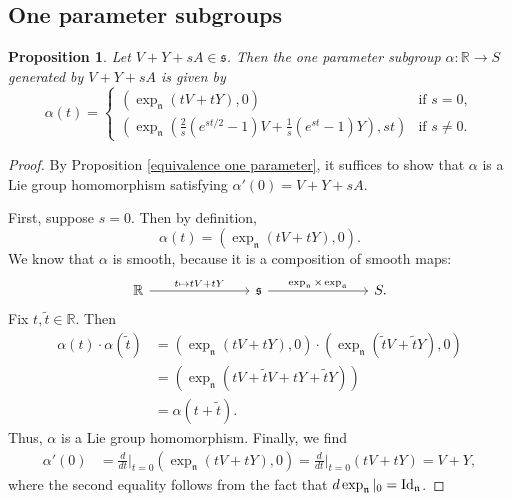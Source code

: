 \documentclass{amsart}
\newcommand{\R}{\mathbb R}
\newcommand{\id}{\text{\normalfont Id}}
\newcommand{\s}{\mathfrak s}
\newcommand{\n}{\mathfrak n}
\renewcommand{\a}{\mathfrak a}
\theoremstyle{plain}
\newtheorem{proposition}[theorem]{Proposition}
\theoremstyle{definition}
\theoremstyle{remark}
\begin{document}
 	\subsection{One parameter subgroups}
 	\begin{proposition}
 		\label{one parameter subgroup}
 		Let $V+Y+sA \in \s$. Then the one parameter subgroup $\alpha: \R \rightarrow S$ generated by $V + Y + sA$ is given by 
 		$$\alpha(t) = \begin{cases}
 			(\exp_{\n}(tV + tY),0) & \text{if }s = 0, \\
 			\left(\exp_{\n}\left(\frac 2s(e^{st/2}-1)V + \frac1s(e^{st}-1) Y\right),st\right) & \text{if }s \neq  0.
 		\end{cases}$$
 	\end{proposition}
 	\begin{proof}
 		By Proposition \ref{equivalence one parameter}, it suffices to show that $\alpha$ is a Lie group homomorphism satisfying $\alpha'(0) = V + Y + sA$.
 		
 		First, suppose $s = 0$. Then by definition,
 		$$\alpha(t) = (\exp_{\n}(tV + tY),0).$$
 		We know that $\alpha$ is smooth, because it is a composition of smooth maps:
 		$$\begin{tikzcd}
 			\R \arrow{rrr}{t \mapsto t V + tY} &&& \s  \arrow{rrr}{\exp_\n \times \exp_\a}&&& S.
 		\end{tikzcd}$$
 		Fix $t, \widetilde t \in \R$. Then 
 		\begin{align*}
 			\alpha(t) \cdot \alpha(\widetilde t) &= (\exp_{\n}(tV + tY),0) \cdot (\exp_{\n}(\widetilde tV + \widetilde tY),0) \\
 			&= \left( \exp_\n(tV + \widetilde t V + t Y + \widetilde tY)\right) \\
 			&= \alpha(t + \widetilde t).
 		\end{align*}
 		Thus, $\alpha$ is a Lie group homomorphism. Finally, we find 
 		\begin{align*}
 			\alpha'(0) &= \frac{d}{dt}\bigg|_{t= 0}\left(\exp_\n(tV+tY),0\right) = \frac{d}{dt}\bigg|_{t= 0}(tV+tY)  =V+Y,
 		\end{align*}
 		where the second equality follows from the fact that $d \exp_\n|_0 = \id_\n$.
 		

\end{proof}
\end{document}
